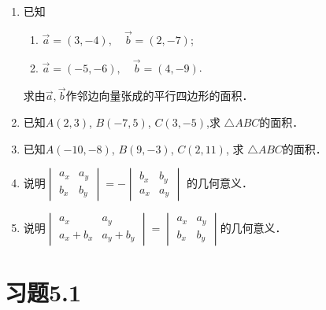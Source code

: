 \begin{ex}
\begin{enumerate}
    \item 已知
 \begin{enumerate}
    \item $\vec{a}=(3,-4),\quad \vec{b}=(2,-7)$;
    \item $\vec{a}=(-5,-6),\quad \vec{b}=(4,-9)$.
\end{enumerate}   
    求由$\vec{a},\vec{b}$作邻边向量张成的平行四边形的面积．
    
    \item 已知$A(2, 3)$, $B(-7, 5)$, $C(3,-5)$,求
    $\triangle ABC$的面积．
    \item  已知$A(-10,-8)$, $B(9,-3)$, $C(2, 11)$, 求
    $\triangle ABC$的面积．
    \item 说明$\begin{vmatrix}
       a_x&a_y\\b_x&b_y 
    \end{vmatrix}=-\begin{vmatrix}
        b_x&b_y \\a_x&a_y
    \end{vmatrix}$
    的几何意义．
    \item 说明$\begin{vmatrix}
        a_x&a_y\\a_x+b_x&a_y+b_y 
     \end{vmatrix}=\begin{vmatrix}
         a_x&a_y \\ b_x&b_y
     \end{vmatrix}$的几何意义．
\end{enumerate}
\end{ex}

\section*{习题5.1}

